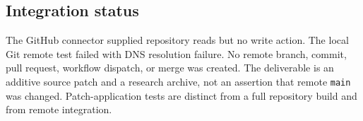 \subsection{Integration status}
The GitHub connector supplied repository reads but no write action. The local Git remote test failed with DNS resolution failure. No remote branch, commit, pull request, workflow dispatch, or merge was created. The deliverable is an additive source patch and a research archive, not an assertion that remote \texttt{main} was changed. Patch-application tests are distinct from a full repository build and from remote integration.



\endgroup
